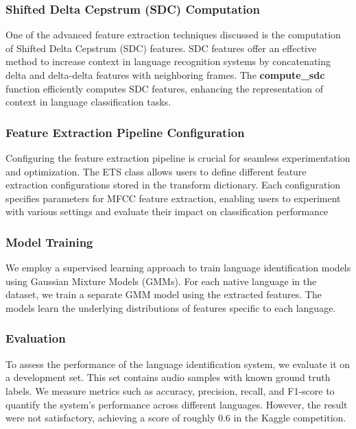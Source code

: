 \documentclass{Interspeech2024}
\begin{document}
\subsubsection{Shifted Delta Cepstrum (SDC) Computation}

One of the advanced feature extraction techniques discussed is the computation of Shifted Delta Cepstrum (SDC) features. SDC features offer an effective method to increase context in language recognition systems by concatenating delta and delta-delta features with neighboring frames. The\textbf{ compute\_sdc }function efficiently computes SDC features, enhancing the representation of context in language classification tasks.


\subsubsection{Feature Extraction Pipeline Configuration}

Configuring the feature extraction pipeline is crucial for seamless experimentation and optimization. The ETS class allows users to define different feature extraction configurations stored in the transform dictionary. Each configuration specifies parameters for MFCC feature extraction, enabling users to experiment with various settings and evaluate their impact on classification performance

\subsubsection{Model Training}

 We employ a supervised learning approach to train language identification models using Gaussian Mixture Models (GMMs). For each native language in the dataset, we train a separate GMM model using the extracted features. The models learn the underlying distributions of features specific to each language.

\subsubsection{Evaluation}
To assess the performance of the language identification system, we evaluate it on a development set. This set contains audio samples with known ground truth labels. We measure metrics such as accuracy, precision, recall, and F1-score to quantify the system's performance across different languages.
However, the result were not satisfactory, achieving a score of roughly 0.6 in the Kaggle competition.
\end{document}
